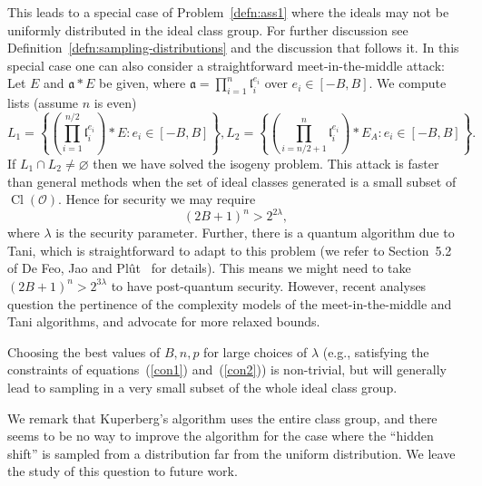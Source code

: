 \documentclass{llncs}
\newcommand{\OO}{\mathcal{O}}
\DeclareMathOperator{\Cl}{Cl}
\renewcommand{\a}{\mathfrak{a}}
\renewcommand{\l}{\mathfrak{l}}
\begin{document}
This leads to a special case of Problem~\ref{defn:ass1} where the ideals may not be uniformly distributed in the ideal class group. For further discussion see Definition~\ref{defn:sampling-distributions} and the discussion that follows it.
In this special case one can also consider a straightforward meet-in-the-middle attack: Let $E$ and $\a * E$ be given, where $\a = \prod_{i=1}^n \l_i^{e_i}$ over $e_i \in [-B, B]$.
We compute lists (assume $n$ is even)
\[
   L_1 = \left\{ \left( \prod_{i=1}^{n/2} \l_i^{e_i} \right) * E : e_i \in [-B,B] \right\} 
 ,
   L_2 = \left\{ \left( \prod_{i=n/2 + 1}^{n} \l_i^{e_i} \right) * E_A : e_i \in [-B,B] \right\}.
\]
If $L_1 \cap L_2 \ne \varnothing$ then we have solved the isogeny problem.
This attack is faster than general methods when the set of ideal classes generated is a small subset of $\Cl( \OO )$.
Hence for security we may require
\begin{equation} \label{con2}
   (2B+1)^n > 2^{2 \lambda},
\end{equation}
where $\lambda$ is the security parameter.
Further, there is a quantum algorithm due to Tani, which is straightforward to adapt to this problem (we refer to Section~5.2 of De Feo, Jao and Pl{\^{u}}t~\cite{FJP14} for details).
This means we might need to take $(2B+1)^n > 2^{3 \lambda}$ to have post-quantum security.
However, recent analyses~\cite{adj+menezes+al-isogenies,cryptoeprint:2019:103} question the pertinence of the complexity models of the meet-in-the-middle and Tani algorithms, and advocate for more relaxed bounds.

Choosing the best values of $B,n,p$ for large choices of $\lambda$ (e.g., satisfying the constraints of equations~(\ref{con1}) and~(\ref{con2})) is non-trivial, but will generally lead to sampling in a very small subset of the whole ideal class group.


We remark that Kuperberg's algorithm uses the entire class group, and there seems to be no way to improve the algorithm for the case where the ``hidden shift'' is sampled from a distribution far from the uniform distribution.
We leave the study of this question to future work.
\end{document}
